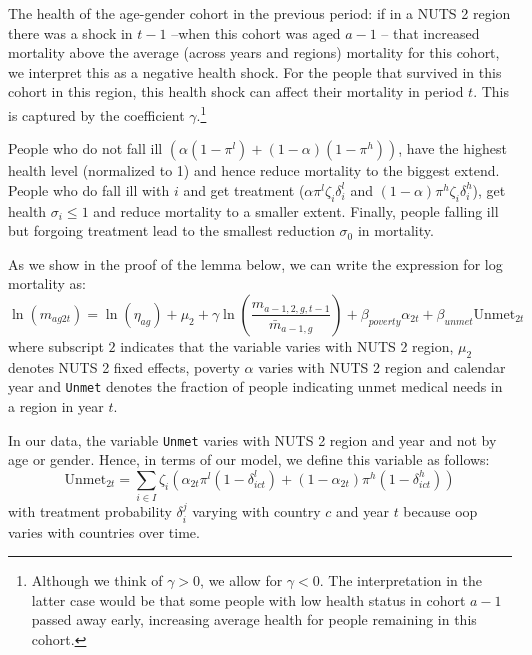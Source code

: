 \documentclass[a4paper,12pt]{article}
\begin{document}
The health of the age-gender cohort in the previous period: if in a NUTS 2 region there was a shock in \(t-1\) --when this cohort was aged \(a-1\) -- that increased mortality above the average (across years and regions) mortality for this cohort, we interpret this as a negative health shock. For the people that survived in this cohort in this region, this health shock can affect their mortality in period \(t\). This is captured by the coefficient \(\gamma\).\footnote{Although we think of \(\gamma>0\), we allow for \(\gamma<0\). The interpretation in the latter case would be that some people with low health status in cohort \(a-1\) passed away early, increasing average health for people remaining in this cohort.}

People who do not fall ill \((\alpha(1-\pi^l)+(1-\alpha)(1-\pi^h))\), have the highest health level (normalized to 1) and hence reduce mortality to the biggest extend. People who do fall ill with \(i\) and get treatment (\(\alpha \pi^l \zeta_i \delta_i^l\) and \((1-\alpha)\pi^h \zeta_i \delta_i^h\)), get health \(\sigma_i \leq 1\) and reduce mortality to a smaller extent. Finally, people falling ill but forgoing treatment lead to the smallest reduction \(\sigma_0\) in mortality.

As we show in the proof of the lemma below, we can write the expression for log mortality as:
\begin{equation}
\label{eq:health2}
\ln(m_{ag2t}) =\ln ( \eta_{ag}) + \mu_2 + \gamma \ln \left( \frac{m_{a-1,2,g,t-1}}{\bar m_{a-1,g}}\right) + \beta_{poverty}\alpha_{2t} + \beta_{unmet}\text{Unmet}_{2t}
\end{equation}
where subscript \(2\) indicates that the variable varies with NUTS 2 region, \(\mu_2\) denotes NUTS 2 fixed effects, poverty \(\alpha\) varies with NUTS 2 region and calendar year and \texttt{Unmet} denotes the fraction of people indicating unmet medical needs in a region in year \(t\). 

In our data, the variable \texttt{Unmet} varies with NUTS 2 region and year and not by age or gender. Hence, in terms of our model, we define this variable as follows:
\begin{equation}
\label{eq:Unmet}
\text{Unmet}_{2t} = \sum_{i \in I} \zeta_i (\alpha_{2t} \pi^l (1-\delta^l_{ict}) + (1-\alpha_{2t}) \pi^h (1-\delta^h_{ict}))
\end{equation}
with treatment probability \(\delta^j_i\) varying with country \(c\) and year \(t\) because oop varies with countries over time.
\end{document}
